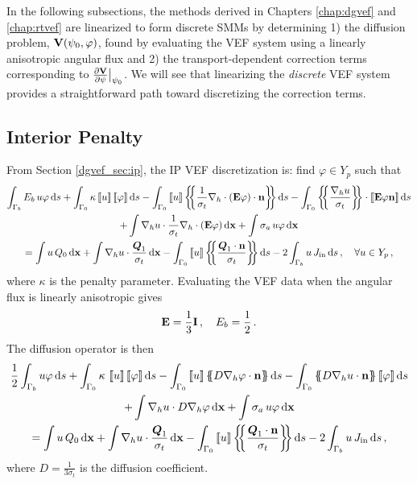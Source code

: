 \documentclass[../doc.tex]{subfiles}
\begin{document}
In the following subsections, the methods derived in Chapters \ref{chap:dgvef} and \ref{chap:rtvef} are linearized to form discrete SMMs by determining 1) the diffusion problem, $\boldsymbol{\mathrm{V}}(\psi_0, \varphi)$, found by evaluating the VEF system using a linearly anisotropic angular flux and 2) the transport-dependent correction terms corresponding to $\frac{\partial \boldsymbol{\mathrm{V}}}{\partial \psi}\big\rvert_{\psi_0}$. We will see that linearizing the \emph{discrete} VEF system provides a straightforward path toward discretizing the correction terms. 

\subsection{Interior Penalty}
From Section \ref{dgvef_sec:ip}, the IP VEF discretization is: find $\varphi\in Y_p$ such that 
	\begin{multline} \label{smm:ipvef}
		\int_{\Gamma_b} E_b\, u \varphi \ud s + \int_{\Gamma_0} \kappa \jump{u} \jump{\varphi} \ud s - \int_{\Gamma_0} \jump{u} \avg{\frac{1}{\sigma_t}\nablah\cdot\paren{\E\varphi}\cdot\n} \ud s - \int_{\Gamma_0} \avg{\frac{\nablah u}{\sigma_t}} \cdot \jump{\E\varphi\n} \ud s \\
		+ \int \nablah u \cdot \frac{1}{\sigma_t}\nablah\cdot\paren{\E\varphi} \ud \x + \int \sigma_a\, u \varphi \ud \x \\ 
		= \int u\, Q_0 \ud \x + \int \nablah u \cdot \frac{\vec{Q}_1}{\sigma_t} \ud \x - \int_{\Gamma_0} \jump{u} \avg{\frac{\vec{Q}_1\cdot\n}{\sigma_t}} \ud s - 2\int_{\Gamma_b} u\, \Jin \ud s \,, \quad \forall u \in Y_p \,, 
	\end{multline}
where $\kappa$ is the penalty parameter. Evaluating the VEF data when the angular flux is linearly anisotropic gives
	\begin{equation}
		\boldsymbol{\mathrm{E}} = \frac{1}{3}\boldsymbol{\mathrm{I}} \,, \quad E_b = \frac{1}{2} \,. 
	\end{equation}
The diffusion operator is then 
	\begin{multline}
		\frac{1}{2}\int_{\Gamma_b} u\varphi \ud s + \int_{\Gamma_0} \kappa\, \jump{u}\jump{\varphi} \ud s - \int_{\Gamma_0} \jump{u}\avg{D\nablah\varphi\cdot\n} \ud s - \int_{\Gamma_0} \avg{D\nablah u\cdot\n} \jump{\varphi} \ud s \\
		+ \int \nablah u \cdot D\nablah\varphi \ud \x + \int \sigma_a\, u \varphi \ud \x \\
		= \int u\, Q_0 \ud \x + \int \nablah u \cdot \frac{\vec{Q}_1}{\sigma_t} \ud \x - \int_{\Gamma_0} \jump{u} \avg{\frac{\vec{Q}_1\cdot\n}{\sigma_t}} \ud s - 2\int_{\Gamma_b} u\, \Jin \ud s \,,
	\end{multline}
where $D = \frac{1}{3\sigma_t}$ is the diffusion coefficient. 
\end{document}
